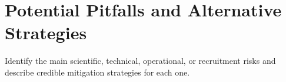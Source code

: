\section{Potential Pitfalls and Alternative Strategies}

Identify the main scientific, technical, operational, or recruitment
risks and describe credible mitigation strategies for each one.
